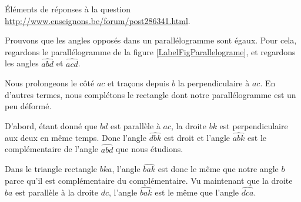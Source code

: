 Éléments de réponses à la question
\href{http://www.enseignons.be/forum/post286341.html}{http://www.enseignons.be/forum/post286341.html}.


\newcommand{\CaptionFigParallelograme}{Le parallélogramme}



Prouvons que les angles opposés dans un parallélogramme sont égaux. Pour cela, regardons le parallélogramme de la figure \ref{LabelFigParallelograme}, et regardons les angles $\widehat{abd}$ et $\widehat{acd}$.

Nous prolongeons le côté $ac$ et traçons depuis $b$ la perpendiculaire à $ac$. En d'autres termes, nous \og complétons\fg{} le rectangle dont notre parallélogramme est un peu déformé.

D'abord, étant donné que $bd$ est parallèle à $ac$, la droite $bk$ est perpendiculaire aux deux en même temps. Donc l'angle $\widehat{dbk}$ est droit et l'angle $\widehat{abk}$ est le complémentaire de l'angle $\widehat{abd}$ que nous étudions.

Dans le triangle rectangle $bka$, l'angle $\widehat{bak}$ est donc le même que notre angle $b$ parce qu'il est complémentaire du complémentaire. Vu maintenant que la droite $ba$ est parallèle à la droite $dc$, l'angle $\widehat{bak}$ est le même que l'angle $\widehat{dca}$.

